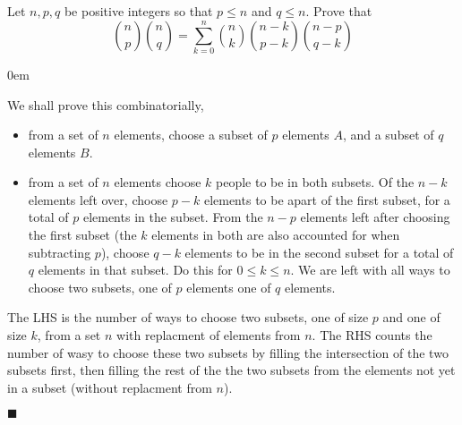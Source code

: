 \documentclass[12pt]{article}
\author{Warren Atkison}
\date{\today}
\renewcommand{\qed}{\hfill$\blacksquare$}
\renewenvironment{proof}{\vspace{1em}\begin{addmargin}[2em]{0em}\begin{newproof}}{\end{newproof}\end{addmargin}\qed}
\newenvironment{problem}[2][Problem]{\begin{trivlist}
\item[\hskip \labelsep {\bfseries #1} \hskip \labelsep {\bfseries #2.}]}{\end{trivlist}}
\begin{document}
\fancyhf{}
\fancyhead[R]{\today}
\fancyfoot[R]{\thepage}

\begin{problem}{2}
	Let $n,p,q$ be positive integers so that $p\le n$ and $q \le n$. Prove that
	\[
		\binom{n}{p} \binom{n}{q} = \sum_{k=0}^n \binom{n}{k} \binom{n-k}{p-k}\binom{n-p}{q-k}
	\]
\end{problem}
\begin{proof}
	We shall prove this combinatorially,
	\begin{itemize}
		\item[\textbf{LHS:}] from a set of $n$ elements, choose a subset of $p$ elements $A$, and a subset of $q$ elements $B$.
		\item[\textbf{RHS:}] from a set of $n$ elements choose $k$ people to be in both subsets. Of the $n-k$ elements left over, choose $p-k$ elements to be apart of the first subset, for a total of $p$ elements in the subset. From the $n-p$ elements left after choosing the first subset (the $k$ elements in both are also accounted for when subtracting $p$), choose $q - k$ elements to be in the second subset for a total of $q$ elements in that subset. Do this for $0 \le k \le n$. We are left with all ways to choose two subsets, one of $p$ elements one of $q$ elements. 
	\end{itemize}
	\begin{center}		
	\end{center}
	The LHS is the number of ways to choose two subsets, one of size $p$ and one of size $k$, from a set $n$ with replacment of elements from $n$. The RHS counts the number of wasy to choose these two subsets by filling the intersection of the two subsets first, then filling the rest of the the two subsets from the elements not yet in a subset (without replacment from $n$).
\end{proof}
\end{document}
